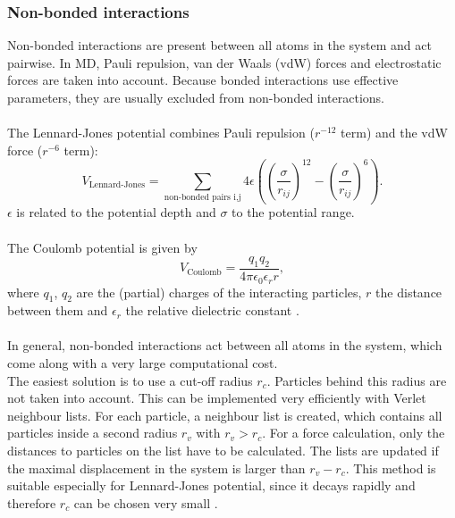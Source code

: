 \subsubsection{Non-bonded interactions}
Non-bonded interactions are present between all atoms in the system and act pairwise. In MD, Pauli repulsion, van der Waals (vdW) forces and electrostatic forces are taken into account. Because bonded interactions use effective parameters, they are usually excluded from non-bonded interactions. %
\\
\\
The Lennard-Jones potential combines Pauli repulsion ($r^{-12}$ term) and the vdW force ($r^{-6}$ term):
\begin{equation}
V_\text{Lennard-Jones} = \sum_{\text{non-bonded pairs i,j}} 4 \epsilon\left(\left(\frac{\sigma}{r_{ij}}\right)^{12} - \left(\frac{\sigma}{r_{ij}}\right)^6\right).
\end{equation}
$\epsilon$ is related to the potential depth and $\sigma$ to the potential range.\\
\\
The Coulomb potential is given by
\begin{equation}
V_\text{Coulomb} = \frac{q_1 q_2}{4 \pi \epsilon_0 \epsilon_r r},
\end{equation}
where $q_1$, $q_2$ are the (partial) charges of the interacting particles, $r$ the distance between them and $\epsilon_r$ the relative dielectric constant \autocite[p. 65-71]{gromacsManual}.\\
\\
In general, non-bonded interactions act between all atoms in the system, which come along with a very large computational cost.\\
The easiest solution is to use a cut-off radius $r_c$. Particles behind this radius are not taken into account. This can be implemented very efficiently with Verlet neighbour lists. For each particle, a neighbour list is created, which contains all particles inside a second radius $r_v$ with $r_v > r_c$. For a force calculation, only the distances to particles on the list have to be calculated. The lists are updated if the maximal displacement in the system is larger than $r_v - r_c$. This method is suitable especially for Lennard-Jones potential, since it decays rapidly and therefore $r_c$ can be chosen very small \autocite[p. 144]{greenBook}.\\
